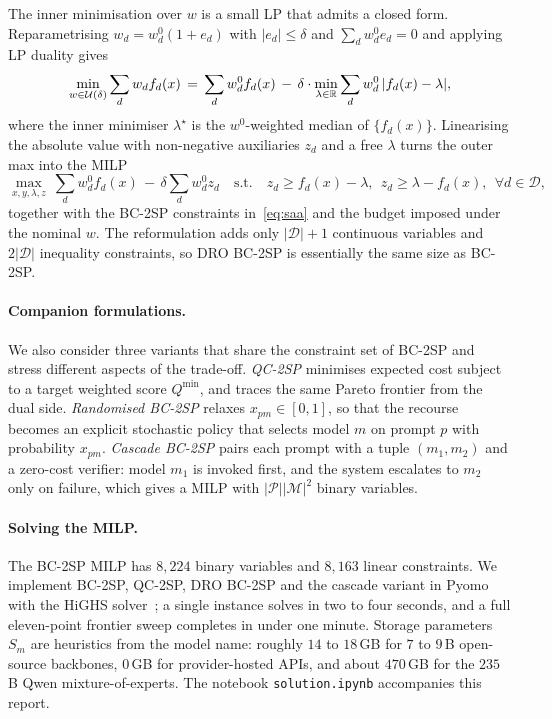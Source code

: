 \documentclass[11pt]{article}
\newcommand{\pP}{\mathcal{P}}\newcommand{\pM}{\mathcal{M}}
\newcommand{\pD}{\mathcal{D}}\newcommand{\pU}{\mathcal{U}}
\begin{document}
The inner minimisation over $w$ is a small LP that admits a closed form.
Reparametrising $w_d=w_d^{0}(1+e_d)$ with $|e_d|\le\delta$ and
$\sum_d w_d^{0} e_d=0$ and applying LP duality gives
\begin{equation}
\min_{w\in\pU(\delta)}\sum_d w_d f_d(x)
\,=\,\sum_d w_d^{0} f_d(x)\,-\,
   \delta\cdot\min_{\lambda\in\R}\sum_d w_d^{0}\,|f_d(x)-\lambda|,
\end{equation}
where the inner minimiser $\lambda^{\star}$ is the $w^{0}$-weighted median
of $\{f_d(x)\}$. Linearising the absolute value with non-negative
auxiliaries $z_d$ and a free $\lambda$ turns the outer max into the MILP
\begin{equation}
\max_{x,y,\lambda,z}\
\sum_d w_d^{0} f_d(x)\,-\,\delta\sum_d w_d^{0} z_d
\quad\text{s.t.}\quad
z_d\ge f_d(x)-\lambda,\ \ z_d\ge \lambda-f_d(x), \ \ \forall d\in\pD,
\label{eq:dro_milp}
\end{equation}
together with the BC-2SP constraints in~\eqref{eq:saa} and the budget
imposed under the nominal $w$. The reformulation adds only $|\pD|+1$
continuous variables and $2|\pD|$ inequality constraints, so DRO BC-2SP is
essentially the same size as BC-2SP.

\paragraph{Companion formulations.}
We also consider three variants that share the constraint set of
BC-2SP and stress different aspects of the trade-off. \emph{QC-2SP}
minimises expected cost subject to a target weighted score $Q^{\min}$, and
traces the same Pareto frontier from the dual side. \emph{Randomised
BC-2SP} relaxes $x_{pm}\in[0,1]$, so that the recourse becomes an explicit
stochastic policy that selects model $m$ on prompt $p$ with probability
$x_{pm}$. \emph{Cascade BC-2SP} pairs each prompt with a tuple
$(m_1,m_2)$ and a zero-cost verifier: model $m_1$ is invoked first, and the
system escalates to $m_2$ only on failure, which gives a MILP with
$|\pP||\pM|^2$ binary variables.

\paragraph{Solving the MILP.}
The BC-2SP MILP has $8{,}224$ binary variables and $8{,}163$ linear
constraints. We implement BC-2SP, QC-2SP, DRO BC-2SP and the cascade variant
in Pyomo~\citep{bynum2021pyomo} with the HiGHS solver~\citep{huangfu2018parallelizing};
a single instance solves in two to four seconds, and a full eleven-point
frontier sweep completes in under one minute.
Storage parameters $S_m$ are heuristics from the model name: roughly $14$ to
$18$\,GB for $7$ to $9$\,B open-source backbones, $0$\,GB for provider-hosted
APIs, and about $470$\,GB for the $235$\,B Qwen mixture-of-experts. The
notebook \texttt{solution.ipynb} accompanies this report.
\end{document}
